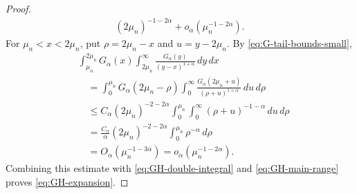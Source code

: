 \documentclass[10pt,a4paper]{amsart}
\begin{document}
\begin{proof}
\begin{equation}
\begin{aligned}
 (2\mu_n)^{-1-2\alpha}
 +o_\alpha(\mu_n^{-1-2\alpha}).
 \end{aligned}
\end{equation}
For $\mu_n<x<2\mu_n$, put $\rho=2\mu_n-x$ and $u=y-2\mu_n$.
By \eqref{eq:G-tail-bounds-small},
\[
 \begin{aligned}
 &\int_{\mu_n}^{2\mu_n}G_\alpha(x)\int_{2\mu_n}^\infty
 \frac{G_\alpha(y)}{(y-x)^{1+\alpha}}\,dy\,dx\\
 &\quad=\int_0^{\mu_n}G_\alpha(2\mu_n-\rho)
 \int_0^\infty\frac{G_\alpha(2\mu_n+u)}
 {(\rho+u)^{1+\alpha}}\,du\,d\rho\\
 &\quad\le C_\alpha(2\mu_n)^{-2-2\alpha}
 \int_0^{\mu_n}\int_0^\infty
 (\rho+u)^{-1-\alpha}\,du\,d\rho\\
 &\quad=\frac{C_\alpha}{\alpha}(2\mu_n)^{-2-2\alpha}
 \int_0^{\mu_n}\rho^{-\alpha}\,d\rho\\
 &\quad=O_\alpha(\mu_n^{-1-3\alpha})
 =o_\alpha(\mu_n^{-1-2\alpha}).
 \end{aligned}
\]
Combining this estimate with \eqref{eq:GH-double-integral} and
\eqref{eq:GH-main-range} proves \eqref{eq:GH-expansion}.
\end{proof}
\end{document}
